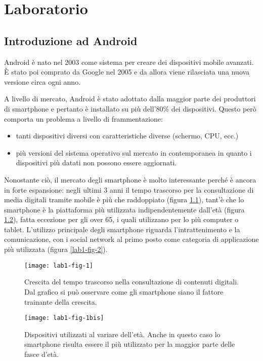 \part{Laboratorio}

\chapter{Introduzione ad Android}

Android è nato nel 2003 come sistema per creare dei dispositivi mobile
avanzati.
\`E stato poi comprato da Google nel 2005 e da allora viene rilasciata
una nuova versione circa ogni anno.

A livello di mercato, Android è stato adottato dalla maggior parte dei
produttori di smartphone e pertanto è installato su più dell'80\% dei
dispositivi.
Questo però comporta un problema a livello di frammentazione:

\begin{itemize}
	\item tanti dispositivi diversi con caratteristiche diverse (schermo, CPU, ecc.)
	\item più versioni del sistema operativo sul mercato in contemporanea in quanto i dispositivi più datati non possono essere aggiornati.
\end{itemize}

Nonostante ciò, il mercato degli smartphone è molto interessante perché è ancora in forte espansione: negli ultimi 3 anni il tempo trascorso per la consultazione di media digitali tramite mobile è più che raddoppiato (figura \ref{lab1-fig-1}), tant'è che lo smartphone è la piattaforma più utilizzata indipendentemente dall'età (figura \ref{lab1-fig-1bis}), fatta eccezione per gli over 65, i quali utilizzano per lo più computer o tablet.
L'utilizzo principale degli smartphone riguarda l'intrattenimento e la comunicazione, con i social network al primo posto come categoria di applicazione più utilizzata (figura \ref{lab1-fig-2}).


\begin{figure}[htbp]
	\centering
	\texttt{[image: lab1-fig-1]}
	\caption{Crescita del tempo trascorso nella consultazione di contenuti digitali. Dal grafico si può osservare come gli smartphone siano il fattore trainante della crescita.}\label{lab1-fig-1}
\end{figure}

\begin{figure}[htbp]
	\centering
	\texttt{[image: lab1-fig-1bis]}
	\caption{Dispositivi utilizzati al variare dell'età. Anche in questo caso lo smartphone risulta essere il più utilizzato per la maggior parte delle fasce d'età.}\label{lab1-fig-1bis}
\end{figure}

